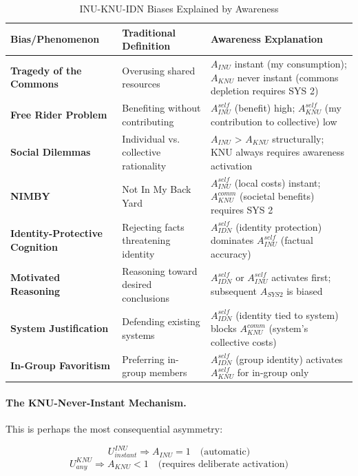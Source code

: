 \begin{table}[htbp]
\centering
\caption{INU-KNU-IDN Biases Explained by Awareness}
\label{tab:category-biases}
\renewcommand{\arraystretch}{1.4}
\begin{tabular}{@{}lp{4cm}p{6cm}@{}}
\toprule
\textbf{Bias/Phenomenon} & \textbf{Traditional Definition} & \textbf{Awareness Explanation} \\
\midrule
\textbf{Tragedy of the Commons} & 
Overusing shared resources & 
$A_{INU}$ instant (my consumption); $A_{KNU}$ never instant (commons depletion requires SYS 2) \\
\midrule
\textbf{Free Rider Problem} & 
Benefiting without contributing & 
$A^{self}_{INU}$ (benefit) high; $A^{self}_{KNU}$ (my contribution to collective) low \\
\midrule
\textbf{Social Dilemmas} & 
Individual vs. collective rationality & 
$A_{INU}$ > $A_{KNU}$ structurally; KNU always requires awareness activation \\
\midrule
\textbf{NIMBY} & 
Not In My Back Yard & 
$A^{self}_{INU}$ (local costs) instant; $A^{comm}_{KNU}$ (societal benefits) requires SYS 2 \\
\midrule
\textbf{Identity-Protective Cognition} & 
Rejecting facts threatening identity & 
$A^{self}_{IDN}$ (identity protection) dominates $A^{self}_{INU}$ (factual accuracy) \\
\midrule
\textbf{Motivated Reasoning} & 
Reasoning toward desired conclusions & 
$A^{self}_{IDN}$ or $A^{self}_{INU}$ activates first; subsequent $A_{SYS2}$ is biased \\
\midrule
\textbf{System Justification} & 
Defending existing systems & 
$A^{self}_{IDN}$ (identity tied to system) blocks $A^{comm}_{KNU}$ (system's collective costs) \\
\midrule
\textbf{In-Group Favoritism} & 
Preferring in-group members & 
$A^{self}_{IDN}$ (group identity) activates $A^{self}_{KNU}$ for in-group only \\
\bottomrule
\end{tabular}
\end{table}

\paragraph{The KNU-Never-Instant Mechanism.}
This is perhaps the most consequential asymmetry:

\begin{equation}
U^{INU}_{instant} \Rightarrow A_{INU} = 1 \quad \text{(automatic)}
\end{equation}
\begin{equation}
U^{KNU}_{any} \Rightarrow A_{KNU} < 1 \quad \text{(requires deliberate activation)}
\end{equation}

